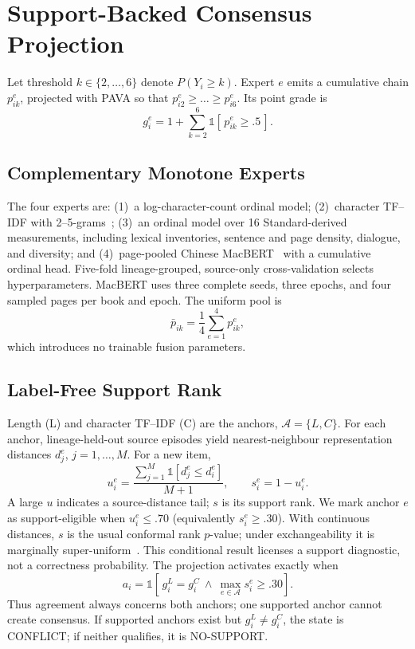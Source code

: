 \documentclass[conference]{IEEEtran}
\begin{document}
\section{Support-Backed Consensus Projection}

Let threshold $k \in \{2,\dots,6\}$ denote $P(Y_i \ge k)$. Expert $e$ emits a
cumulative chain $p_{ik}^{e}$, projected with PAVA so that
$p_{i2}^{e} \ge \dots \ge p_{i6}^{e}$. Its point grade is
\begin{equation}
g_i^{e} = 1 + \sum_{k=2}^{6} \mathbb{1}\!\left[\,p_{ik}^{e} \ge .5\,\right].
\end{equation}

\subsection{Complementary Monotone Experts}
The four experts are: (1)~a log-character-count ordinal model; (2)~character
TF--IDF with 2--5-grams~\cite{salton1988term}; (3)~an ordinal model over 16
Standard-derived measurements, including lexical inventories, sentence and page
density, dialogue, and diversity; and (4)~page-pooled Chinese
MacBERT~\cite{cui2020revisiting} with a cumulative ordinal head. Five-fold
lineage-grouped, source-only cross-validation selects hyperparameters. MacBERT
uses three complete seeds, three epochs, and four sampled pages per book and
epoch. The uniform pool is
\begin{equation}
\bar{p}_{ik} = \frac{1}{4}\sum_{e=1}^{4} p_{ik}^{e},
\label{eq_pool}
\end{equation}
which introduces no trainable fusion parameters.

\subsection{Label-Free Support Rank}
Length (L) and character TF--IDF (C) are the anchors, $\mathcal{A}=\{L,C\}$. For
each anchor, lineage-held-out source episodes yield nearest-neighbour
representation distances $d_j^{e}$, $j=1,\dots,M$. For a new item,
\begin{equation}
u_i^{e} = \frac{\sum_{j=1}^{M} \mathbb{1}\!\left[d_j^{e} \le d_i^{e}\right]}{M+1},
\qquad s_i^{e} = 1 - u_i^{e}.
\end{equation}
A large $u$ indicates a source-distance tail; $s$ is its support rank. We mark
anchor $e$ as support-eligible when $u_i^{e} \le .70$ (equivalently
$s_i^{e} \ge .30$). With continuous distances, $s$ is the usual conformal rank
$p$-value; under exchangeability it is marginally
super-uniform~\cite{bates2023testing}. This conditional result licenses a
support diagnostic, not a correctness probability. The projection activates
exactly when
\begin{equation}
a_i = \mathbb{1}\!\left[\, g_i^{L} = g_i^{C} \ \wedge \
\max_{e \in \mathcal{A}} s_i^{e} \ge .30 \right].
\end{equation}
Thus agreement always concerns both anchors; one supported anchor cannot create
consensus. If supported anchors exist but $g_i^{L} \ne g_i^{C}$, the state is
CONFLICT; if neither qualifies, it is NO-SUPPORT.
\end{document}
